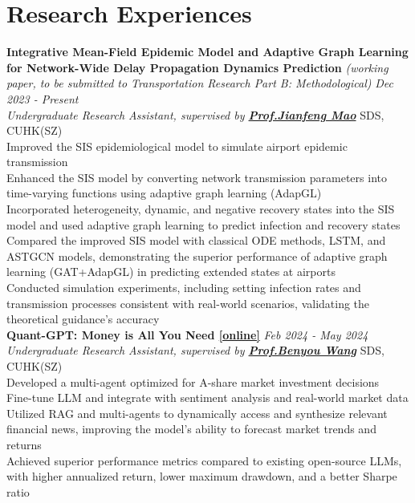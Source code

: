 \documentclass[a4paper,8pt]{article}
\begin{document}
\section*{Research Experiences}
\textbf{Integrative Mean-Field Epidemic Model and Adaptive Graph Learning for Network-Wide Delay Propagation Dynamics Prediction} \textit{\small (working paper, to be submitted to Transportation Research Part B: Methodological)} \hfill \textit{Dec 2023 - Present}\\
\textit{Undergraduate Research Assistant, supervised by \textbf{\href{https://sds.cuhk.edu.cn/en/teacher/268}{Prof.\@ Jianfeng Mao}}} \hfill SDS, CUHK(SZ)\\
\textbullet Improved the SIS epidemiological model to simulate airport epidemic transmission\\
\textbullet Enhanced the SIS model by converting network transmission parameters into time-varying functions using adaptive graph learning (AdapGL)\\
\textbullet Incorporated heterogeneity, dynamic, and negative recovery states into the SIS model and used adaptive graph learning to predict infection and recovery states\\
\textbullet Compared the improved SIS model with classical ODE methods, LSTM, and ASTGCN models, demonstrating the superior performance of adaptive graph learning (GAT+AdapGL) in predicting extended states at airports\\
\textbullet Conducted simulation experiments, including setting infection rates and transmission processes consistent with real-world scenarios, validating the theoretical guidance's accuracy\\
\textbf{Quant-GPT: Money is All You Need \href{https://github.com/TobyYang7/Quant-GPT}{[online]}} \hfill \textit{Feb 2024 - May 2024}\\
\textit{Undergraduate Research Assistant, supervised by \textbf{\href{https://wabyking.github.io/old.html}{Prof.\@ Benyou Wang}}} \hfill SDS, CUHK(SZ)\\
\textbullet Developed a multi-agent optimized for A-share market investment decisions\\ 
\textbullet Fine-tune LLM and integrate with sentiment analysis and real-world market data\\
\textbullet Utilized RAG and multi-agents to dynamically access and synthesize relevant financial news, improving the model's ability to forecast market trends and returns\\
\textbullet Achieved superior performance metrics compared to existing open-source LLMs, with higher annualized return, lower maximum drawdown, and a better Sharpe ratio\\
\end{document}
